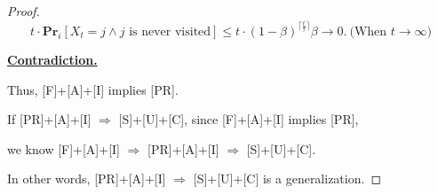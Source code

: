 \documentclass{article}
\renewcommand{\Pr}[2]{\mathbf{Pr}_{#1}\left[#2\right]}
\begin{document}
\begin{proof}
    \vspace{-1.5em}
    $$t\cdot\Pr{i}{X_t=j \land \text{$j$ is never visited}}\le t\cdot(1-\beta)^{\lceil\frac{t}{\tau}\rceil}\beta \rightarrow 0.\ \text{(When $t\rightarrow\infty$)}$$
    
    \vspace{-0.7em} \hspace{1.3em}
    \underline{\textbf{Contradiction.}}
    
    \hspace{1.3em}
    Thus, [F]+[A]+[I] implies [PR].
    
    \vspace{2em} \hspace{1.3em}
    If [PR]+[A]+[I] $\Rightarrow$ [S]+[U]+[C], since [F]+[A]+[I] implies [PR], 
    
    \hspace{6em}
    we know [F]+[A]+[I] $\Rightarrow$ [PR]+[A]+[I] $\Rightarrow$ [S]+[U]+[C].
    
    \hspace{1.3em}
    In other words, [PR]+[A]+[I] $\Rightarrow$ [S]+[U]+[C] is a generalization.
\end{proof}

\vspace{2em}
\end{document}
